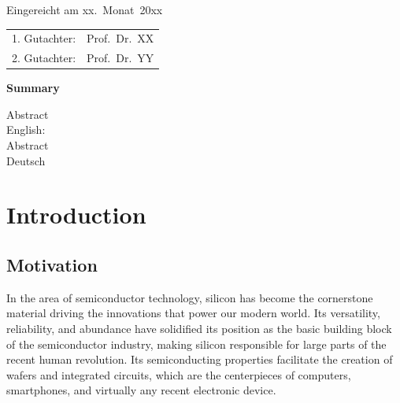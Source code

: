 	
	\thispagestyle{empty}\vspace*{48em}
	
	Eingereicht am xx.~Monat~20xx\vspace{1.5em}
	\par{\large\begin{tabular}{ll}
			1. Gutachter: & Prof.~Dr.~XX \\
			2. Gutachter: & Prof.~Dr.~YY \\
	\end{tabular}}
	
	
	\newpage
	\begin{center}\large\bfseries Summary\end{center}
	
	
	Abstract \\
	English: \\
	
	\vspace{20em}
	Abstract \\
	Deutsch \\
	
	
	
	\tableofcontents
	
	
	
	\mainmatter
	\renewcommand{\chapterautorefname}{Chapter}
	\renewcommand{\sectionautorefname}{Section}
	\chapter{Introduction}
	\section{Motivation}
	In the area of semiconductor technology, silicon has become the cornerstone material driving the innovations that power our modern world. Its versatility, reliability, and abundance have solidified its position as the basic building block of the semiconductor industry, making silicon responsible for large parts of the recent human revolution. Its semiconducting properties facilitate the creation of wafers and integrated circuits, which are the centerpieces of computers, smartphones, and virtually any recent electronic device. \\
	
